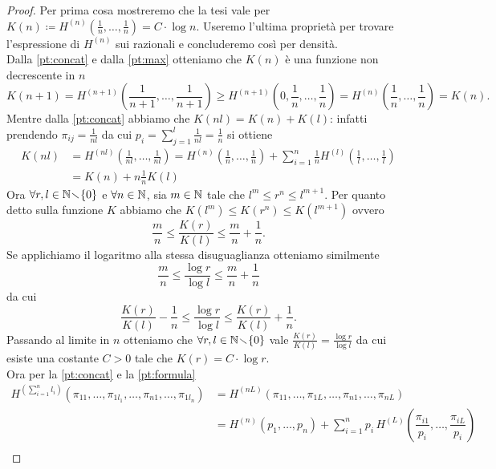 \begin{proof}
    Per prima cosa mostreremo che la tesi vale per $ K(n) \coloneqq H^{(n)}\left(\frac{1}{n}, \ldots, \frac{1}{n}\right) = C \cdot \log{n} $. Useremo l'ultima proprietà per trovare l'espressione di $ H^{(n)} $ sui razionali e concluderemo così per densità. \\
    Dalla \ref{pt:concat} e dalla \ref{pt:max} otteniamo che $ K(n) $ è una funzione non decrescente in $ n $
    \[
        K(n+1) = H^{(n+1)}\left(\frac{1}{n+1}, \ldots, \frac{1}{n+1}\right) \geq H^{(n+1)}\left(0, \frac{1}{n}, \ldots, \frac{1}{n}\right) = H^{(n)}\left(\frac{1}{n}, \ldots, \frac{1}{n}\right) = K(n).
    \]
    Mentre dalla \ref{pt:concat} abbiamo che $ K(nl) = K(n) + K(l) $: infatti prendendo $ \pi_{ij} = \frac{1}{nl} $ da cui $ p_i = \sum_{j=1}^{l} \frac{1}{nl} = \frac{1}{n} $ si ottiene
    \begin{align*}
        K(nl) & = H^{(nl)}\left(\frac{1}{nl}, \ldots, \frac{1}{nl}\right) = H^{(n)}\left(\frac{1}{n}, \ldots, \frac{1}{n}\right) + \sum_{i=1}^{n} \frac{1}{n} H^{(l)} \left(\frac{1}{l}, \ldots, \frac{1}{l}\right) \\
        & = K(n) + n\frac{1}{n} K(l)
    \end{align*}
    Ora $ \forall r, l \in \mathbb{N}\!\smallsetminus\!\{0\} $ e $ \forall n \in \mathbb{N} $, sia $ m \in \mathbb{N} $ tale che $ l^{m} \leq r^{n} \leq l^{m+1} $. Per quanto detto sulla funzione $ K $ abbiamo che $ K(l^m) \leq K(r^{n}) \leq K(l^{m+1}) $ ovvero
    \[ \frac{m}{n} \leq \frac{K(r)}{K(l)} \leq \frac{m}{n} + \frac{1}{n}. \]
    Se applichiamo il logaritmo alla stessa disuguaglianza otteniamo similmente
    \[ \frac{m}{n} \leq \frac{\log{r}}{\log{l}} \leq \frac{m}{n} + \frac{1}{n} \]
    da cui
    \[ \frac{K(r)}{K(l)} - \frac{1}{n} \leq \frac{\log{r}}{\log{l}} \leq \frac{K(r)}{K(l)} + \frac{1}{n}. \]
    Passando al limite in $ n $ otteniamo che $ \forall r, l \in \mathbb{N}\!\smallsetminus\!\{0\} $ vale $ \frac{K(r)}{K(l)} = \frac{\log{r}}{\log{l}} $ da cui esiste una costante $ C > 0 $ tale che $ K(r) = C \cdot \log{r} $. \\
    Ora per la \ref{pt:concat} e la \ref{pt:formula}
    \begin{align*}
        H^{\left(\sum_{i=1}^{n} l_i\right)}(\pi_{11},\ldots,\pi_{1l_1}
        , \ldots, \pi_{n1},\ldots,\pi_{1l_n}) & = H^{(nL)}(\pi_{11}, \ldots, \pi_{1L}, \ldots, \pi_{n1}, \ldots, \pi_{nL}) \\
        & = H^{(n)}(p_1, \ldots, p_n) + \sum_{i=1}^{n} p_i \, H^{(L)} \left(\dfrac{\pi_{i1}}{p_i}, \ldots, \dfrac{\pi_{iL}}{p_i}\right) \\

\end{align*}
\end{proof}
